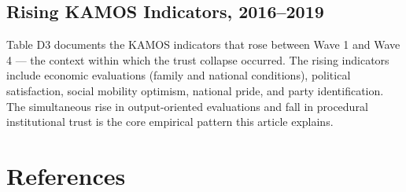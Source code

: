 \documentclass[
  12pt,
  letterpaper]{article}
\begin{document}
\subsection{Rising KAMOS Indicators, 2016--2019}\label{sec-rising}

Table D3 documents the KAMOS indicators that rose between Wave 1 and
Wave 4 --- the context within which the trust collapse occurred. The
rising indicators include economic evaluations (family and national
conditions), political satisfaction, social mobility optimism, national
pride, and party identification. The simultaneous rise in
output-oriented evaluations and fall in procedural institutional trust
is the core empirical pattern this article explains.

\section*{References}\label{references}

\label{refs}
\end{document}
